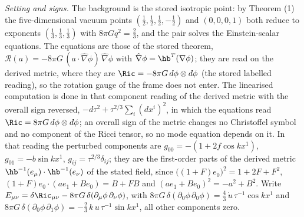\emph{Setting and signs.} The background is the stored isotropic point: by Theorem (1) the five-dimensional vacuum points $(\tfrac12, \tfrac12, \tfrac12, -\tfrac12)$ and $(0, 0, 0, 1)$ both reduce to exponents $(\tfrac13, \tfrac13, \tfrac13)$ with $8\pi G q^{2} = \tfrac23$, and the pair solves the Einstein-scalar equations. The equations are those of the stored theorem, $\mathcal{R}(a) = -8\pi G\,(a\cdot\hat\nabla\phi)\,\hat\nabla\phi$ with $\hat\nabla\phi = \hb^{T}(\nabla\phi)$; they are read on the derived metric, where they are $\Ric = -8\pi G\,d\phi\otimes d\phi$ (the stored labelled reading), so the rotation gauge of the frame does not enter. The linearised computation is done in that component reading of the derived metric with the overall sign reversed, $-d\tau^{2} + \tau^{2/3}\sum_{i}(dx^{i})^{2}$, in which the equations read $\Ric = 8\pi G\,d\phi\otimes d\phi$; an overall sign of the metric changes no Christoffel symbol and no component of the Ricci tensor, so no mode equation depends on it. In that reading the perturbed components are $g_{00} = -(1 + 2f\cos kx^{1})$, $g_{01} = -b\sin kx^{1}$, $g_{ij} = \tau^{2/3}\delta_{ij}$; they are the first-order parts of the derived metric $\hb^{-1}(e_{\mu})\cdot\hb^{-1}(e_{\nu})$ of the stated field, since $\bigl((1 + F)e_{0}\bigr)^{2} = 1 + 2F + F^{2}$, $(1 + F)e_{0}\cdot(ae_{1} + Be_{0}) = B + FB$ and $(ae_{1} + Be_{0})^{2} = -a^{2} + B^{2}$. Write $E_{\mu\nu} = \delta\Ric_{\mu\nu} - 8\pi G\,\delta(\partial_{\mu}\phi\,\partial_{\nu}\phi)$, with $8\pi G\,\delta(\partial_{0}\phi\,\partial_{0}\phi) = \tfrac43\,\dot u\,\tau^{-1}\cos kx^{1}$ and $8\pi G\,\delta(\partial_{0}\phi\,\partial_{1}\phi) = -\tfrac23\,k\,u\,\tau^{-1}\sin kx^{1}$, all other components zero.

